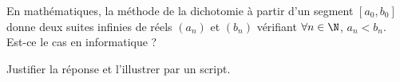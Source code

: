 En mathématiques, la méthode de la dichotomie à partir d'un segment $[a_0,b_0]$ donne deux suites infinies de réels $(a_n)$ et $(b_n)$ vérifiant $\forall n \in \N$, $a_n<b_n$.
Est-ce le cas en informatique ? 

Justifier la réponse et l'illustrer par un script.
